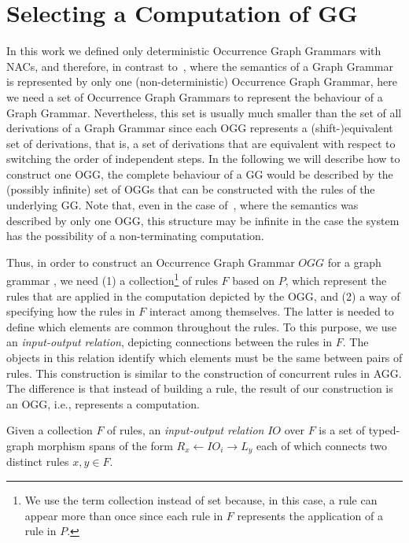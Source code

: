 \section{Selecting a Computation of GG}

  In this work we defined only deterministic Occurrence Graph Grammars with NACs, and therefore, in contrast to~\cite{Ribeiro1996}, where the semantics of a Graph Grammar is represented by only one (non-deterministic) Occurrence Graph Grammar, here we need a set of Occurrence Graph Grammars to represent the behaviour of a Graph Grammar.
  Nevertheless, this set is usually much smaller than the set of all derivations of a Graph Grammar since each OGG represents a (shift-)equivalent set of derivations, that is, a set of derivations that are equivalent with respect to switching the order of independent steps. 
  In the following we will describe how to construct one OGG, the complete behaviour of a GG would be described by the (possibly infinite) set of OGGs that can be constructed with the rules of the underlying GG. Note that, even in the case of~\cite{Ribeiro1996}, where the semantics was described by only one OGG, this structure may be  infinite in the case the system has the possibility of a non-terminating computation.

  Thus, in order to construct an Occurrence Graph Grammar $OGG$ for a graph grammar \graphGrammar{}, we need (1) a collection\footnote{ We use the term collection instead of set because, in this case, a rule can appear more than once since each rule in $F$ represents the application of a rule in $P$.} of rules $F$ based on $P$, which represent the rules that are applied in the computation depicted by the OGG, and (2) a way of specifying how the rules in $F$ interact among themselves. 
  The latter is needed to define which elements are common throughout the rules. To this purpose, we use an \emph{input-output relation}, depicting connections between the rules in $F$.
  The objects in this relation identify which elements must be the same between pairs of rules.
  This construction is similar to the construction of concurrent rules in AGG.
  The difference is that instead of building a rule, the result of our construction is an OGG, i.e., represents a computation.

\begin{definition} Given a collection $F$ of rules, an \emph{input-output relation} $IO$ over $F$ is a set of typed-graph morphism spans of the form \mbox{$R_x \leftarrow IO_i \rightarrow L_y$} each of which connects two distinct rules $x,y \in F$.

\end{definition}


